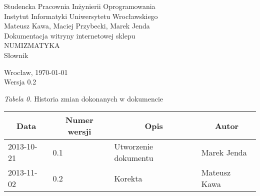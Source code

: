 \documentclass 	[11pt, a4paper, leqno]	{article}					%
\begin{document}

\begin{center}
	\thispagestyle{empty} 							%
	{\large Studencka Pracownia Inżynierii Oprogramowania} 		\\ [0.5cm]
	{\large Instytut Informatyki Uniwersytetu Wrocławskiego} 	\\ [6.0cm]

	{\large Mateusz Kawa, Maciej Przybecki, Marek Jenda} 		\\ [1.5cm]

	{\huge Dokumentacja witryny internetowej sklepu} 			\\ [0.5cm]
	{\huge NUMIZMATYKA} 										\\ [1.5cm]

	{\large Słownik} 										 	\\ [0.5cm]

	\vfill
	
	{\large Wrocław, \today}									\\ [0.5cm]
	{\large Wersja 0.2}
\end{center}

\newpage


\textit{Tabela 0.} Historia zmian dokonanych w dokumencie

\begin{center}
	\begin{tabular}{| l | l | l | l |}
		\hline
		\multicolumn{1}{|c|}{Data} & 
		\multicolumn{1}{|c|}{Numer wersji} &  
		\multicolumn{1}{|c|}{Opis} &
		\multicolumn{1}{|c|}{Autor} \\ \hline \hline
		2013-10-21 & 0.1 & Utworzenie dokumentu & Marek Jenda \\ \hline
		2013-11-02 & 0.2 & Korekta & Mateusz Kawa \\ \hline
	\end{tabular}
\end{center}
\newpage
\end{document}
